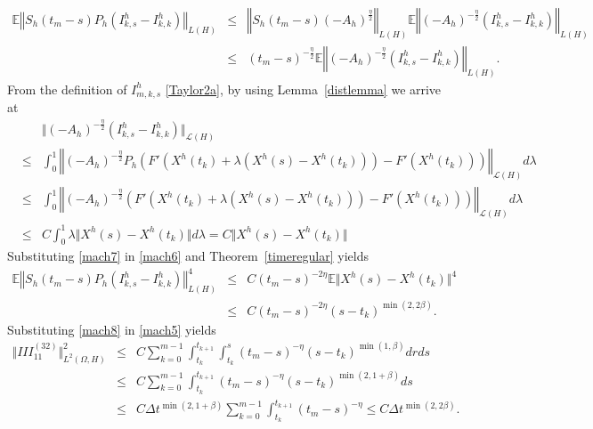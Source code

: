 \documentclass[review,12pt]{elsarticle}
\newcommand{\thmref}[1]{{Theorem~\ref{#1}}}
\newcommand{\lemref}[1]{{Lemma~\ref{#1}}}
\begin{document}
 \begin{eqnarray}
 \label{mach6}
\mathbb{E}\left\Vert S_h(t_m-s)P_h\left(I^h_{k,s}-I^h_{k,k}\right)\right\Vert_{L(H)}
 &\leq&\left\Vert S_h(t_m-s)(-A_h)^{\frac{\eta}{2}}\right\Vert_{L(H)}\mathbb{E}\left\Vert(-A_h)^{-\frac{\eta}{2}}\left(I^h_{k,s}-I^h_{k,k}\right)\right\Vert_{L(H)}\nonumber\\
 &\leq& (t_m-s)^{-\frac{\eta}{2}}\mathbb{E}\left\Vert(-A_h)^{-\frac{\eta}{2}} \left(I^h_{k,s}-I^h_{k,k}\right)\right\Vert_{L(H)}.
 \end{eqnarray}
  From the definition of $I^h_{m,k,s}$ \eqref{Taylor2a}, by using   \lemref{distlemma}  we arrive at 
 \begin{eqnarray}
 \label{mach7}
 &&\Vert (-A_h)^{-\frac{\eta}{2}}\left(I^h_{k,s}-I^h_{k,k}\right)\Vert_{\mathcal{L}(H)}\nonumber\\
&\leq& \int_0^1\left\Vert (-A_h)^{-\frac{\eta}{2}}P_h\left( F'\left(X^h(t_k)+\lambda\left(X^h(s)-X^h(t_{k})\right)\right)-F'\left(X^h(t_{k})\right)\right)\right\Vert_{\mathcal{L}(H)}d\lambda\nonumber\\
&\leq& \int_0^1\left\Vert (-A_h)^{-\frac{\eta}{2}}\left( F'\left(X^h(t_{k})+\lambda\left(X^h(s)-X^h(t_{k})\right)\right)-F'\left(X^h(t_{k})\right)\right)\right\Vert_{\mathcal{L}(H)}d\lambda\nonumber\\
&\leq& C\int_0^1\lambda\Vert X^h(s)-X^h(t_{k})\Vert d\lambda=  C\Vert X^h(s)-X^h(t_{k})\Vert
 \end{eqnarray}
 Substituting \eqref{mach7} in \eqref{mach6} and  \thmref{timeregular} yields
 \begin{eqnarray}
 \label{mach8}
 \mathbb{E}\left\Vert S_h(t_m-s)P_h\left(I^h_{k,s}-I^h_{k,k}\right)\right\Vert^4_{L(H)}
 &\leq& C(t_m-s)^{-2\eta}\mathbb{E}\Vert X^h(s)-X^h(t_{k})\Vert^4\nonumber\\
 &\leq& C(t_m-s)^{-2\eta}(s-t_{k})^{\min(2, 2\beta)}.
 \end{eqnarray}
  Substituting \eqref{mach8} in \eqref{mach5} yields
 \begin{eqnarray}
 \label{mach9}
 \Vert III_{11}^{(32)}\Vert^2_{L^2(\Omega, H)}
 &\leq& C\sum_{k=0}^{m-1}\int_{t_{k}}^{t_{k+1}}\int_{t_{k}}^s(t_m-s)^{-\eta}(s-t_{k})^{\min(1, \beta)}drds\nonumber\\
 &\leq&  C\sum_{k=0}^{m-1}\int_{t_{k}}^{t_{k+1}}(t_m-s)^{-\eta}(s-t_{k})^{\min(2, 1+\beta)}ds\nonumber\\
 &\leq& C\Delta t^{\min(2, 1+\beta)}\sum_{k=0}^{m-1}\int_{t_{k}}^{t_{k+1}}(t_m-s)^{-\eta}\leq C\Delta t^{\min(2, 2\beta)}.
 \end{eqnarray}
\end{document}
